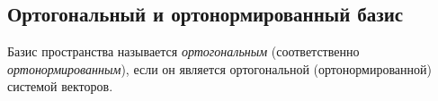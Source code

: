 \begin{comment}
    Всякая ортогональная (и в частности ортонормированная) система векторов автоматически линейно независима.
    \begin{equation*}
        \det G(v_1, \dots, v_k) = |v_1|^2 \cdot |v_2|^2 \dotsm |v_k|^2 \neq 0
    .\end{equation*}
\end{comment}


\subsection{Ортогональный и ортонормированный базис}

\begin{definition}
    Базис пространства называется \textit{ортогональным} (соответственно \textit{ортонормированным}), если он является ортогональной (ортонормированной) системой векторов.
\end{definition}
